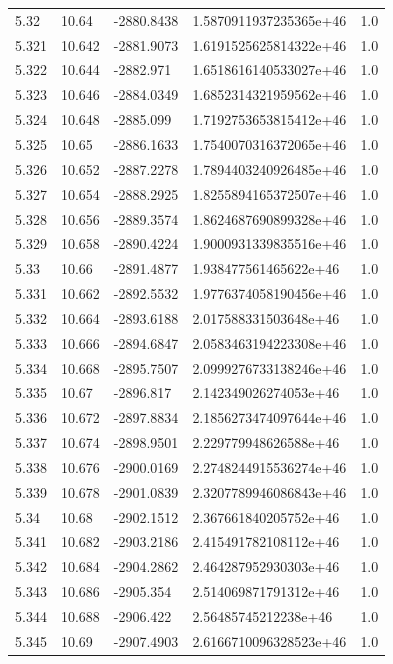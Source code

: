 \begin{tabular}{lllll}
5.32 & 10.64 & -2880.8438 & 1.5870911937235365e+46 & 1.0 \\
5.321 & 10.642 & -2881.9073 & 1.6191525625814322e+46 & 1.0 \\
5.322 & 10.644 & -2882.971 & 1.6518616140533027e+46 & 1.0 \\
5.323 & 10.646 & -2884.0349 & 1.6852314321959562e+46 & 1.0 \\
5.324 & 10.648 & -2885.099 & 1.7192753653815412e+46 & 1.0 \\
5.325 & 10.65 & -2886.1633 & 1.7540070316372065e+46 & 1.0 \\
5.326 & 10.652 & -2887.2278 & 1.7894403240926485e+46 & 1.0 \\
5.327 & 10.654 & -2888.2925 & 1.8255894165372507e+46 & 1.0 \\
5.328 & 10.656 & -2889.3574 & 1.8624687690899328e+46 & 1.0 \\
5.329 & 10.658 & -2890.4224 & 1.9000931339835516e+46 & 1.0 \\
5.33 & 10.66 & -2891.4877 & 1.938477561465622e+46 & 1.0 \\
5.331 & 10.662 & -2892.5532 & 1.9776374058190456e+46 & 1.0 \\
5.332 & 10.664 & -2893.6188 & 2.017588331503648e+46 & 1.0 \\
5.333 & 10.666 & -2894.6847 & 2.0583463194223308e+46 & 1.0 \\
5.334 & 10.668 & -2895.7507 & 2.0999276733138246e+46 & 1.0 \\
5.335 & 10.67 & -2896.817 & 2.142349026274053e+46 & 1.0 \\
5.336 & 10.672 & -2897.8834 & 2.1856273474097644e+46 & 1.0 \\
5.337 & 10.674 & -2898.9501 & 2.229779948626588e+46 & 1.0 \\
5.338 & 10.676 & -2900.0169 & 2.2748244915536274e+46 & 1.0 \\
5.339 & 10.678 & -2901.0839 & 2.3207789946086843e+46 & 1.0 \\
5.34 & 10.68 & -2902.1512 & 2.367661840205752e+46 & 1.0 \\
5.341 & 10.682 & -2903.2186 & 2.415491782108112e+46 & 1.0 \\
5.342 & 10.684 & -2904.2862 & 2.464287952930303e+46 & 1.0 \\
5.343 & 10.686 & -2905.354 & 2.514069871791312e+46 & 1.0 \\
5.344 & 10.688 & -2906.422 & 2.56485745212238e+46 & 1.0 \\
5.345 & 10.69 & -2907.4903 & 2.6166710096328523e+46 & 1.0 \\

\end{tabular}
